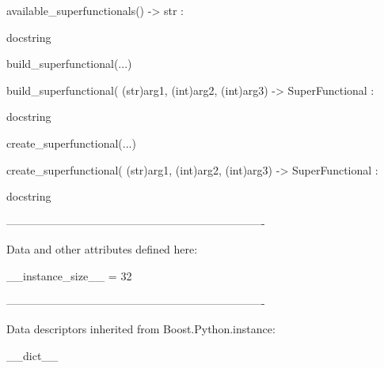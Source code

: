 \documentclass[letterpaper,10pt,english]{sphinxmanual}
\begin{document}
\begin{description}
\begin{description}
\begin{DUlineblock}{0em}
\begin{DUlineblock}{\DUlineblockindent}
\item[] available\_superfunctionals() -\textgreater{} str :
\item[]
\begin{DUlineblock}{\DUlineblockindent}
\item[] docstring
\item[] 
\end{DUlineblock}
\end{DUlineblock}
\item[] build\_superfunctional(...)
\item[]
\begin{DUlineblock}{\DUlineblockindent}
\item[] build\_superfunctional( (str)arg1, (int)arg2, (int)arg3) -\textgreater{} SuperFunctional :
\item[]
\begin{DUlineblock}{\DUlineblockindent}
\item[] docstring
\item[] 
\end{DUlineblock}
\end{DUlineblock}
\item[] create\_superfunctional(...)
\item[]
\begin{DUlineblock}{\DUlineblockindent}
\item[] create\_superfunctional( (str)arg1, (int)arg2, (int)arg3) -\textgreater{} SuperFunctional :
\item[]
\begin{DUlineblock}{\DUlineblockindent}
\item[] docstring
\item[] 
\end{DUlineblock}
\end{DUlineblock}
\item[] ----------------------------------------------------------------------
\item[] Data and other attributes defined here:
\item[] 
\item[] \_\_instance\_size\_\_ = 32
\item[] 
\item[] ----------------------------------------------------------------------
\item[] Data descriptors inherited from Boost.Python.instance:
\item[] 
\item[] \_\_dict\_\_
\item[] 

\end{DUlineblock}
\end{description}
\end{description}
\end{document}
